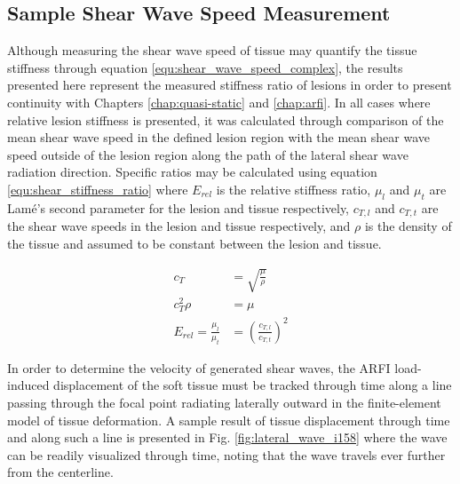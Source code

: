 		\subsection{Sample Shear Wave Speed Measurement}
		\label{subsubsec:shear_results_sample_wave_speed}
			Although measuring the shear wave speed of tissue may quantify the tissue stiffness through equation \ref{equ:shear_wave_speed_complex}, the results presented here represent the measured stiffness ratio of lesions in order to present continuity with Chapters \ref{chap:quasi-static} and \ref{chap:arfi}. In all cases where relative lesion stiffness is presented, it was calculated through comparison of the mean shear wave speed in the defined lesion region with the mean shear wave speed outside of the lesion region along the path of the lateral shear wave radiation direction. Specific ratios may be calculated using equation \ref{equ:shear_stiffness_ratio} where $E_{rel}$ is the relative stiffness ratio, $\mu_l$ and $\mu_t$ are Lam\'{e}'s second parameter for the lesion and tissue respectively, $c_{T,l}$ and $c_{T,t}$ are the shear wave speeds in the lesion and tissue respectively, and $\rho$ is the density of the tissue and assumed to be constant between the lesion and tissue.

			\begin{subequations}
				\label{equ:shear_stiffness_ratio}
				\begin{align}
					c_T &= \sqrt{\frac{\mu}{\rho}} \\
					c_T^2\rho &= \mu \\
					E_{rel} = \frac{\mu_l}{\mu_t} &= \left(\frac{c_{T,l}}{c_{T,t}}\right)^2
				\end{align}
			\end{subequations}

			In order to determine the velocity of generated shear waves, the ARFI load-induced displacement of the soft tissue must be tracked through time along a line passing through the focal point radiating laterally outward in the finite-element model of tissue deformation. A sample result of tissue displacement through time and along such a line is presented in Fig. \ref{fig:lateral_wave_i158} where the wave can be readily visualized through time, noting that the wave travels ever further from the centerline.

